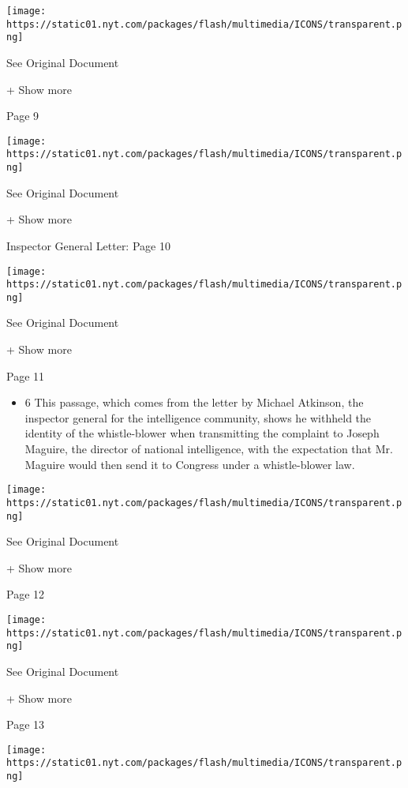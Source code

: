 \protect\hyperlink{}{}

\texttt{[image: https://static01.nyt.com/packages/flash/multimedia/ICONS/transparent.png]}

See Original Document

+ Show more

Page 9

\protect\hyperlink{}{}

\texttt{[image: https://static01.nyt.com/packages/flash/multimedia/ICONS/transparent.png]}

See Original Document

+ Show more

Inspector General Letter: Page 10

\protect\hyperlink{}{}

\texttt{[image: https://static01.nyt.com/packages/flash/multimedia/ICONS/transparent.png]}

See Original Document

+ Show more

Page 11

\begin{itemize}
\tightlist
\item
  6 This passage, which comes from the letter by Michael Atkinson, the
  inspector general for the intelligence community, shows he withheld
  the identity of the whistle-blower when transmitting the complaint to
  Joseph Maguire, the director of national intelligence, with the
  expectation that Mr. Maguire would then send it to Congress under a
  whistle-blower law.
\end{itemize}

\protect\hyperlink{}{}

\texttt{[image: https://static01.nyt.com/packages/flash/multimedia/ICONS/transparent.png]}

See Original Document

+ Show more

Page 12

\protect\hyperlink{}{}

\texttt{[image: https://static01.nyt.com/packages/flash/multimedia/ICONS/transparent.png]}

See Original Document

+ Show more

Page 13

\protect\hyperlink{}{}

\texttt{[image: https://static01.nyt.com/packages/flash/multimedia/ICONS/transparent.png]}

